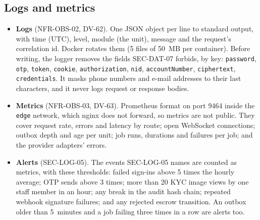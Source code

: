 \documentclass[11pt,a4paper]{article}
\begin{document}
\subsection{Logs and metrics}
\begin{itemize}[nosep]
  \item \textbf{Logs} (NFR-OBS-02, DV-62). One JSON object per line to standard output, with time (UTC), level, module (the unit), message and the request's correlation id. Docker rotates them (5 files of 50~MB per container). Before writing, the logger removes the fields SEC-DAT-07 forbids, by key: \texttt{password}, \texttt{otp}, \texttt{token}, \texttt{cookie}, \texttt{authorization}, \texttt{nid}, \texttt{accountNumber}, \texttt{ciphertext}, \texttt{credentials}. It masks phone numbers and e-mail addresses to their last characters, and it never logs request or response bodies.
  \item \textbf{Metrics} (NFR-OBS-03, DV-63). Prometheus format on port 9464 inside the \texttt{edge} network, which nginx does not forward, so metrics are not public. They cover request rate, errors and latency by route; open WebSocket connections; outbox depth and age per unit; job runs, durations and failures per job; and the provider adapters' errors.
  \item \textbf{Alerts} (SEC-LOG-05). The events SEC-LOG-05 names are counted as metrics, with these thresholds: failed sign-ins above 5 times the hourly average; OTP sends above 3 times; more than 20 KYC image views by one staff member in an hour; any break in the audit hash chain; repeated webhook signature failures; and any rejected escrow transition. An outbox older than 5~minutes and a job failing three times in a row are alerts too.
\end{itemize}
\end{document}
